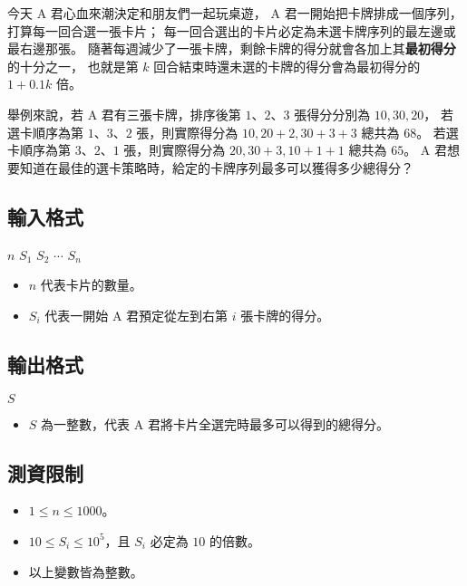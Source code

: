 今天 A 君心血來潮決定和朋友們一起玩桌遊， A
君一開始把卡牌排成一個序列，打算每一回合選一張卡片；
每一回合選出的卡片必定為未選卡牌序列的最左邊或最右邊那張。
隨著每週減少了一張卡牌，剩餘卡牌的得分就會各加上其\textbf{最初得分}的十分之一，
也就是第 \(k\) 回合結束時還未選的卡牌的得分會為最初得分的 \(1 + 0.1k\)
倍。

舉例來說，若 A 君有三張卡牌，排序後第 \(1\)、\(2\)、\(3\) 張得分分別為
\(10, 30, 20\)， 若選卡順序為第 \(1\)、\(3\)、\(2\) 張，則實際得分為
\(10, 20+2, 30+3+3\) 總共為 \(68\)。 若選卡順序為第 \(3\)、\(2\)、\(1\)
張，則實際得分為 \(20, 30+3, 10+1+1\) 總共為 \(65\)。 A
君想要知道在最佳的選卡策略時，給定的卡牌序列最多可以獲得多少總得分？

\subsection{輸入格式}

\begin{format}
\f{
$n$
$S_1$ $S_2$ $\cdots$ $S_n$
}
\end{format}

\begin{itemize}
\tightlist
\item
  \(n\) 代表卡片的數量。
\item
  \(S_i\) 代表一開始 A 君預定從左到右第 \(i\) 張卡牌的得分。
\end{itemize}

\subsection{輸出格式}

\begin{format}
\f{
$S$
}
\end{format}

\begin{itemize}
\tightlist
\item
  \(S\) 為一整數，代表 A 君將卡片全選完時最多可以得到的總得分。
\end{itemize}

\subsection{測資限制}

\begin{itemize}
\tightlist
\item
  \(1 \le n \le 1000\)。
\item
  \(10 \le S_i \le 10^5\)，且 \(S_i\) 必定為 \(10\) 的倍數。
\item
  以上變數皆為整數。
\end{itemize}

